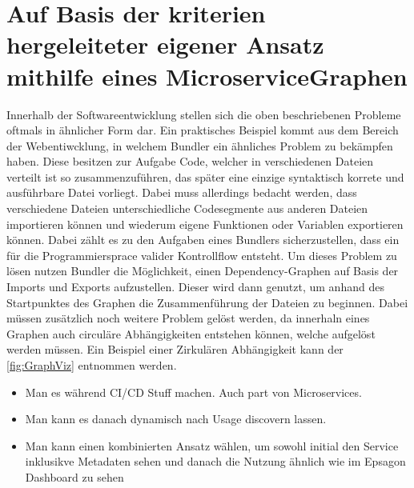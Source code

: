 \documentclass[
	12pt,
	BCOR=5mm,
	DIV=12,
	headinclude=on,
	footinclude=off,
	parskip=half,
	bibliography=totoc,
	listof=entryprefix,
	toc=listof,
	numbers=noenddot,
	plainfootsepline
]{scrreprt}
\begin{document}
\section{Auf Basis der kriterien hergeleiteter eigener Ansatz mithilfe eines MicroserviceGraphen}

Innerhalb der Softwareentwicklung stellen sich die oben beschriebenen Probleme oftmals in ähnlicher Form dar. Ein praktisches Beispiel kommt aus dem Bereich der Webentiwcklung, in welchem Bundler ein ähnliches Problem zu bekämpfen haben. Diese besitzen zur Aufgabe Code, welcher in verschiedenen Dateien verteilt ist so zusammenzuführen, das später eine einzige syntaktisch korrete und ausführbare Datei vorliegt. Dabei muss allerdings bedacht werden, dass verschiedene Dateien unterschiedliche Codesegmente aus anderen Dateien importieren können und wiederum eigene Funktionen oder Variablen exportieren können. Dabei zählt es zu den Aufgaben eines Bundlers sicherzustellen, dass ein für die Programmiersprace valider Kontrollflow entsteht. Um dieses Problem zu lösen nutzen Bundler die Möglichkeit, einen Dependency-Graphen auf Basis der Imports und Exports aufzustellen. Dieser wird dann genutzt, um anhand des Startpunktes des Graphen die Zusammenführung der Dateien zu beginnen. Dabei müssen zusätzlich noch weitere Problem gelöst werden, da innerhaln eines Graphen auch circuläre Abhängigkeiten entstehen können, welche aufgelöst werden müssen. Ein Beispiel einer Zirkulären Abhängigkeit kann der \autoref{fig:GraphViz} entnommen werden.

\begin{itemize}
	\item Man es während CI/CD Stuff machen. Auch part von Microservices.
	\item Man kann es danach dynamisch nach Usage discovern lassen.
	\item Man kann einen kombinierten Ansatz wählen, um sowohl initial den Service inklusikve Metadaten sehen und danach die Nutzung ähnlich wie im Epsagon Dashboard zu sehen
\end{itemize}
\end{document}
